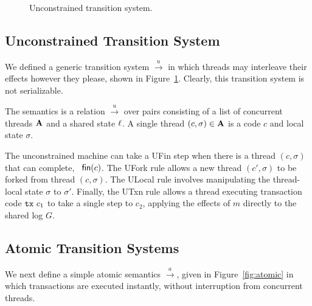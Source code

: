 \begin{figure}
\caption{\label{fig:unconstrained} Unconstrained transition system.}
\end{figure}

\subsection{Unconstrained Transition System}

We defined a generic transition system $\xrightarrow{u}$ in which threads may
interleave their effects however they please, shown in Figure~\ref{fig:unconstrained}. Clearly, this transition
system is not serializable.

 The semantics is a relation
$\xrightarrow{u}$ over pairs consisting of a list of concurrent
threads $\mathbf{A}$ and a shared state $\ell$. 
A single thread $(c,\sigma)\in\mathbf{A}$ is a code $c$ and local state $\sigma$. 

The unconstrained machine can take a {\sc UFin} step when there is a thread
$(c,\sigma)$ that can complete, \ie~$\textsf{fin}(c)$.
%
The {\sc UFork} rule allows a new thread
$(c',\sigma)$ to be forked from thread $(c,\sigma)$.
%
The {\sc ULocal} rule involves manipulating the thread-local state
$\sigma$ to $\sigma'$.
%
Finally, the {\sc UTxn} rule allows a thread executing transaction
code $\texttt{tx}\ c_1$ to take a single step to $c_2$, applying the effects
of $m$ directly to the shared log $G$.

\subsection{Atomic Transition Systems}

We next define a simple atomic semantics $\xrightarrow{a}$,
given in Figure~\ref{fig:atomic}
in which transactions are executed instantly, without interruption
from concurrent threads.

